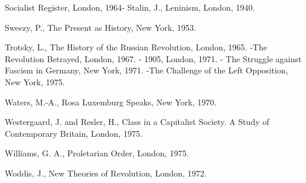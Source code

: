 Socialist Register, London, 1964- Stalin, J., Leninism, London, 1940.

Sweezy, P., The Present as History, New York, 1953.

Trotsky, L., The History of the Russian Revolution, London, 1965.
-The Revolution Betrayed, London, 1967.
- 1905, London, 1971.
- The Struggle against Fascism in Germany, New York, 1971.
-The Challenge of the Left Opposition, New York, 1975.

Waters, M.-A., Rosa Luxemburg Speaks, New York, 1970.

Westergaard, J. and Resler, H., Class in a Capitalist Society. A Study of Contemporary Britain, London, 1975.

Williams, G. A., Proletarian Order, London, 1975.

Woddis, J., New Theories of Revolution, London, 1972.